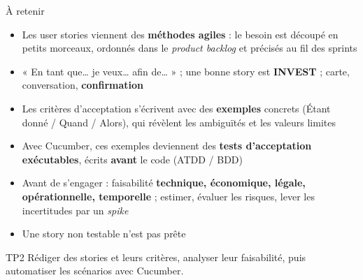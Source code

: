 \documentclass[aspectratio=169,10pt]{beamer}
\begin{document}
\begin{frame}{À retenir}
  \footnotesize
  \begin{itemize}
    \item Les user stories viennent des \textbf{méthodes agiles} : le besoin est découpé en petits morceaux, ordonnés dans le \textit{product backlog} et précisés au fil des sprints
    \item « En tant que\ldots{} je veux\ldots{} afin de\ldots{} » ; une bonne story est \textbf{INVEST} ; carte, conversation, \textbf{confirmation}
    \item Les critères d'acceptation s'écrivent avec des \textbf{exemples} concrets (Étant donné / Quand / Alors), qui révèlent les ambiguïtés et les valeurs limites
    \item Avec Cucumber, ces exemples deviennent des \textbf{tests d'acceptation exécutables}, écrits \textbf{avant} le code (ATDD / BDD)
    \item Avant de s'engager : faisabilité \textbf{technique, économique, légale, opérationnelle, temporelle} ; estimer, évaluer les risques, lever les incertitudes par un \textit{spike}
    \item Une story non testable n'est pas prête
  \end{itemize}
  \vspace{0mm}
  \begin{exampleblock}{TP2}
    Rédiger des stories et leurs critères, analyser leur faisabilité, puis automatiser les scénarios avec Cucumber.
  \end{exampleblock}
\end{frame}

\rquestionslide
\end{document}
